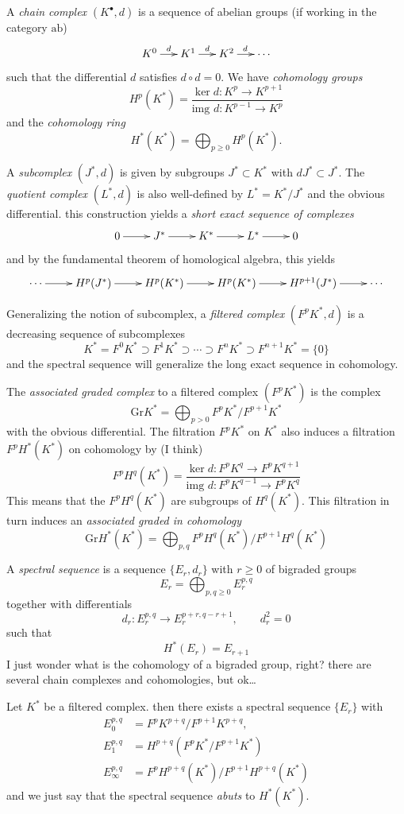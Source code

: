 A {\it chain complex} $(K^\bullet,d)$ is a
sequence of abelian groups (if working in the
category $\text{ab}$)
$$
\xymatrix@C=1.5em{
	K^{0}\ar[r]^{d}&K^{1}\ar[r]^{d}&K^2\ar[r]
	^{d}&\cdots
}
$$
such that the differential $d$ satisfies
$d\circ d=0$. We have {\it cohomology groups}
$$H^{p}(K^*)=\frac{\ker d:K^p\to
K^{p+1}}{\text{img }d:K^{p-1}\to K^p}$$
and the {\it cohomology ring}
$$H^{*}(K^*)=\bigoplus_{p\geq 0}
H^{p}(K^*).$$

A {\it subcomplex} $(J^*,d)$ is given by
subgroups $J^*\subset K^*$
 with $dJ^*\subset J^*$.
The {\it quotient complex} $(L^*,d)$ is also
well-defined by $L^*=K^*/J^*$ and the obvious
differential. this construction yields a {\it
short exact sequence of complexes}
$$
\xymatrix{
	0\ar[r]&J^*\ar[r]&K^*\ar[r]&L^*\ar[r]&0
}
$$
and by the fundamental theorem of homological
algebra, this yields
$$
\xymatrix{
	\cdots\ar[r]&H^{p}(J^*)\ar[r]&H^{p}(K^*)
	\ar[r]
	&H^{p}(K^*)\ar[r]&H^{p+1}(J^*)\ar[r]&\cdots
}
$$

Generalizing the notion of subcomplex, a {\it
filtered complex} $(F^pK^*,d)$ is a
decreasing sequence of subcomplexes
$$K^*=F^0K^*\supset
F^1K^*\supset\cdots\supset F^nK^*\supset
F^{n+1}K^*=\{0\}$$
and the spectral sequence will generalize the
long exact sequence in cohomology.

The {\it associated graded complex} to a
filtered complex $ (F^pK^*)$ is the complex
$$\text{Gr}K^*=\bigoplus_{p>0}
F^pK^*/F^{p+1}K^* $$
with the obvious differential. The filtration
$F^pK^*$ on $K^*$ also induces a filtration
$F^pH^*(K^*)$ on cohomology by (I think)
$$F^pH^q(K^*)=\frac{\ker d:F^pK^q\to
F^pK^{q+1}}{\text{img }d:F^pK^{q-1}\to
F^pK^q}$$
This means that the $F^pH^q(K^*)$ are
subgroups of $H^{q}(K^*)$. This filtration in
turn induces an {\it associated graded in
cohomology}
$$\text{Gr}H^*(K^*)=\bigoplus_{p,q}
F^pH^q(K^*)\big/F^{p+1}H^q(K^*)
$$

\begin{definition}
\label{definition-spect-seque-seque-e-r}
	A {\it spectral sequence} is a sequence
	$\{E_r,d_r\}$ with $r\geq 0$ of bigraded
	groups
	$$E_r=\bigoplus_{p,q\geq 0} E^{p,q}_r $$
together with differentials
$$d_r:E^{p,q}_r\to E^{p+r,q-r+1}_r,\qquad
d^2_r=0$$
such that
$$H^{*}(E_r)=E_{r+1}$$
I just wonder what is the cohomology of a
bigraded group, right? there are several
chain complexes and cohomologies, but ok…
\end{definition}

\begin{proposition}
\label{proposition-exist-descr-chain-compl}
	Let $K^*$ be a filtered complex. then there
	exists a spectral sequence $\{E_r\}$ with
	$$
\begin{aligned}
		E^{p,q}_0&=F^pK^{p+q}/F^{p+1}K^{p+q},\\
		E^{p,q}_1&=H^{p+q}\left( F^pK^*/F^{p+1}K^*
		\right)\\
		E^{p,q}_\infty&=F^pH^{p+q}(K^*)\big/F^{p+1}
		H^{p+q}(K^*)
	\end{aligned}
$$
and we just say that the spectral sequence
{\it abuts} to $H^{*}(K^*)$.
\end{proposition}

